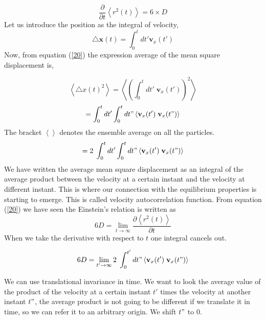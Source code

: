  \begin{equation}\label{20}
 \frac{\partial}{\partial t} \left\langle r^2(t) \right\rangle = 6\times D
 \end{equation}
 \noindent Let us introduce the position as the integral of velocity,
 \begin{equation}
 \bigtriangleup \mathbf{x}(t) = \int_0^t dt' \mathbf{v}_x(t')
 \end{equation}
 \noindent Now, from equation (\ref{20}) the expression average of the mean square displacement is, 
 
 \begin{equation}
 \left\langle \bigtriangleup x(t)^2 \right\rangle = \left\langle \left(\int_0^t dt'\;\mathbf{v}_x(t')\right)^2 \right\rangle 
 \end{equation}
 \begin{equation}
 = \int_0^t dt' \int_0^t dt" \left\langle \mathbf{v}_x(t')\;\mathbf{v}_x(t") \right\rangle
 \end{equation}
 \noindent The bracket $\left\langle \right\rangle$ denotes the ensemble average on all the particles.
 \begin{equation}
 =2\;\int_0^t dt' \int_0^t dt" \left\langle \mathbf{v}_x(t')\;\mathbf{v}_x(t") \right\rangle
 \end{equation}
 \noindent We have written the average mean square displacement as an integral of the average product between the velocity at a certain instant and the velocity at different instant. This is where our connection with the equilibrium properties is starting to emerge. This is called velocity autocorrelation function. From equation (\ref{20}) we have seen the Einstein's relation is written as
 \begin{equation}
 6 D = \lim \limits_{t\to\infty} \frac{\partial \left\langle r^2(t) \right\rangle}{\partial t}
 \end{equation}
 \noindent When we take the derivative with respect to $t$ one integral cancels out.
 
 \begin{equation}
 6 D = \lim \limits_{t'\to\infty} 2\;\int_0^{t'} dt" \left\langle \mathbf{v}_x(t')\;\mathbf{v}_x(t") \right\rangle
 \end{equation}
 
 \noindent We can use translational invariance in time. We want to look the average value of the product of the velocity at a certain instant $t'$ times the velocity at another instant $t"$, the average product is not going to be different if we translate it in time, so we can refer it to an arbitrary origin. We shift $t"$ to $0$.
 
